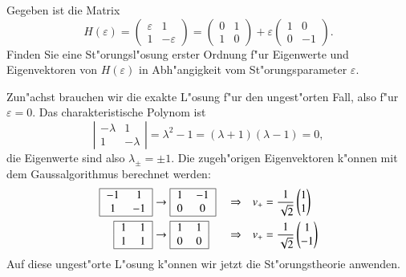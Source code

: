 Gegeben ist die Matrix
\[
H(\varepsilon)
=
\begin{pmatrix}\varepsilon&1\\1&-\varepsilon\end{pmatrix}
=
\begin{pmatrix}0&1\\1&0\end{pmatrix}
+
\varepsilon
\begin{pmatrix}1&0\\0&-1\end{pmatrix}
.
\]
Finden Sie eine St"orungsl"osung erster Ordnung f"ur Eigenwerte und
Eigenvektoren von $H(\varepsilon)$ in Abh"angigkeit vom St"orungsparameter
$\varepsilon$.

\begin{loesung}
Zun"achst brauchen wir die exakte L"osung f"ur den ungest"orten Fall,
also f"ur $\varepsilon=0$. Das charakteristische Polynom ist
\[
\left|
\begin{matrix}-\lambda&1\\1&-\lambda\end{matrix}
\right|
=\lambda^2-1=(\lambda+1)(\lambda-1)=0,
\]
die Eigenwerte sind also $\lambda_\pm=\pm 1$. Die zugeh"origen
Eigenvektoren k"onnen mit dem Gaussalgorithmus berechnet werden:
\[
\begin{aligned}
\begin{tabular}{|>{$}c<{$}>{$}c<{$}|}
\hline
-1&1\\
1&-1\\
\hline
\end{tabular}
&\rightarrow
\begin{tabular}{|>{$}c<{$}>{$}c<{$}|}
\hline
1&-1\\
0&0\\
\hline
\end{tabular}
&&\Rightarrow&
v_+&=\frac1{\sqrt{2}}\begin{pmatrix}1\\1\end{pmatrix}
\\
\begin{tabular}{|>{$}c<{$}>{$}c<{$}|}
\hline
1&1\\
1&1\\
\hline
\end{tabular}
&\rightarrow
\begin{tabular}{|>{$}c<{$}>{$}c<{$}|}
\hline
1&1\\
0&0\\
\hline
\end{tabular}
&&\Rightarrow&
v_+&=\frac1{\sqrt{2}}\begin{pmatrix}1\\-1\end{pmatrix}
\end{aligned}
\]
Auf diese ungest"orte L"osung k"onnen wir jetzt die St"orungstheorie
anwenden.


\end{loesung}
